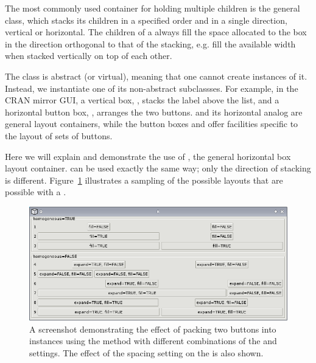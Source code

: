 \documentclass[article,shortnames]{jss}
\begin{document}
The most commonly used container for holding
multiple children is the general  class, which stacks its
children in a specified order and in a single direction, vertical or
horizontal. The children of a  always fill the space
allocated to the box in the direction orthogonal to that of the
stacking, e.g. fill the available width when stacked vertically on top
of each other. 

The  class is abstract (or virtual), meaning
that one cannot create instances of it. Instead, we instantiate one of
its non-abstract subclassses.  For example, in the CRAN mirror GUI, a
vertical box, , stacks the label above the list, and a
horizontal button box, , arranges the two
buttons.  and its horizontal analog  are
general
layout containers, while the button boxes 
and  offer facilities specific to the layout of
sets of buttons.

Here we will explain and demonstrate the use of , the
general horizontal box layout container.  can be used
exactly the same way; only the direction of stacking is different.
Figure~\ref{fig:packing} illustrates a sampling of the possible
layouts that are possible with a .

\begin{figure}[h!tbp]
\begin{center}
\includegraphics{packing.png}
\caption{\label{fig:packing}A screenshot demonstrating the effect of
packing two
buttons into  instances using the 
method 
with different combinations of the  and 
settings. 
The effect of the  spacing setting on the
 is 
also shown.}
\end{center}
\end{figure}
\end{document}
